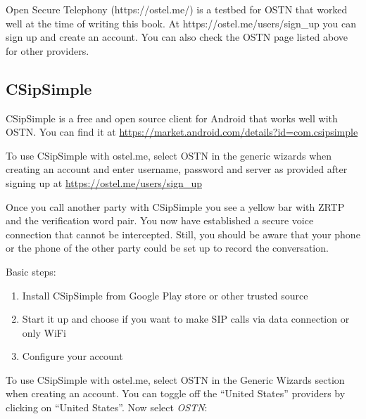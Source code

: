 Open Secure Telephony (https://ostel.me/) is a testbed for OSTN that
worked well at the time of writing this book. At
https://ostel.me/users/sign\_up you can sign up and create an account.
You can also check the OSTN page listed above for other providers.

\subsection{CSipSimple}

CSipSimple is a free and open source client for Android that works well
with OSTN. You can find it at
\href{https://market.android.com/details?id=com.csipsimple}{https://market.android.com/details?id=com.csipsimple}

To use CSipSimple with ostel.me, select OSTN in the generic wizards when
creating an account and enter username, password and server as provided
after signing up at
\href{https://ostel.me/users/sign\_up}{https://ostel.me/users/sign\_up}

Once you call another party with CSipSimple you see a yellow bar with
ZRTP and the verification word pair. You now have established a secure
voice connection that cannot be intercepted. Still, you should be aware
that your phone or the phone of the other party could be set up to
record the conversation.

Basic steps:

\begin{enumerate}[1.]
\item
  Install CSipSimple from Google Play store or other trusted source
\item
  Start it up and choose if you want to make SIP calls via data
  connection or only WiFi
\item
  Configure your account
\end{enumerate}
To use CSipSimple with ostel.me, select OSTN in the Generic Wizards
section when creating an account. You can toggle off the ``United
States'' providers by clicking on ``United States''. Now select
\emph{OSTN}:

